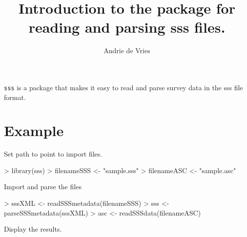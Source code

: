 \documentclass[a4paper]{article}
\title{Introduction to the \sss{} package for reading and parsing sss files.}
\author{Andrie de Vries}
\newcommand{\sss}{{\tt sss}}
\begin{document}
\maketitle

\sss{} is a package that makes it easy to read and parse survey data in the sss file format.

\section{Example}

Set path to point to import files.

\begin{Schunk}
\begin{Sinput}
> library(sss)
> filenameSSS <- "sample.sss"
> filenameASC <- "sample.asc"
\end{Sinput}
\end{Schunk}

Import and parse the files

\begin{Schunk}
\begin{Sinput}
> sssXML <- readSSSmetadata(filenameSSS)
> sss <- parseSSSmetadata(sssXML)
> asc <- readSSSdata(filenameASC)
\end{Sinput}
\end{Schunk}

Display the results.
\end{document}
